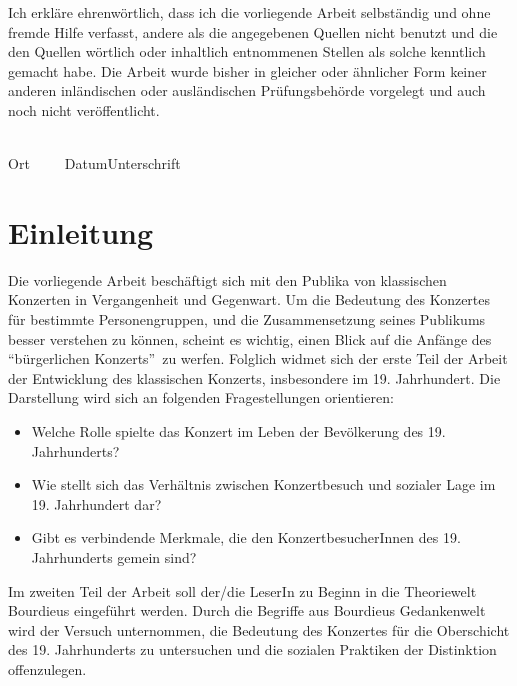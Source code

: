 \documentclass[a4paper, german, oneside]{scrbook}
\begin{document}
\medskip
\noindent
Ich erkläre ehrenwörtlich, dass ich die vorliegende Arbeit selbständig und ohne fremde Hilfe verfasst, andere als die angegebenen Quellen nicht benutzt und die den Quellen wörtlich oder inhaltlich entnommenen Stellen als solche kenntlich gemacht habe. Die Arbeit wurde bisher in gleicher oder ähnlicher Form keiner anderen inländischen oder ausländischen Prüfungsbehörde vorgelegt und auch noch nicht veröffentlicht.

\vspace{3cm}
\noindent
\underline{\hspace{4cm}}\hfill\underline{\hspace{6cm}}\\
Ort~~~~~Datum\hfill Unterschrift\hspace{4cm}


\clearpage
\setcounter{page}{1}

\tableofcontents

\chapter*{Einleitung}
Die vorliegende Arbeit beschäftigt sich mit den Publika von klassischen Konzerten in Vergangenheit und Gegenwart. Um die Bedeutung des Konzertes für bestimmte Personengruppen, und die Zusammensetzung seines Publikums besser verstehen zu können, scheint es wichtig, einen Blick auf die Anfänge des \enquote{bürgerlichen Konzerts} zu werfen. Folglich widmet sich der erste Teil der Arbeit der Entwicklung des klassischen Konzerts, insbesondere im 19. Jahrhundert. Die Darstellung wird sich an folgenden Fragestellungen orientieren:

\begin{itemize}
	\item Welche Rolle spielte das Konzert im Leben der Bevölkerung des 19. Jahrhunderts? %
	\item Wie stellt sich das Verhältnis zwischen Konzertbesuch und sozialer Lage im 19. Jahrhundert dar?
	\item Gibt es verbindende Merkmale, die den KonzertbesucherInnen des 19. Jahrhunderts gemein sind?
\end{itemize}

Im zweiten Teil der Arbeit soll der/die LeserIn zu Beginn in die Theoriewelt Bourdieus eingeführt werden. Durch die Begriffe aus Bourdieus Gedankenwelt wird der Versuch unternommen, die Bedeutung des Konzertes für die Oberschicht des 19. Jahrhunderts zu untersuchen und die sozialen Praktiken der Distinktion offenzulegen.
\end{document}
